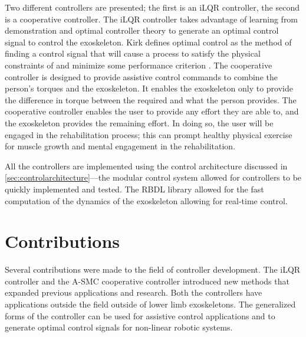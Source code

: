 Two different controllers are presented; the first is an iLQR controller, the second is a cooperative controller. The iLQR controller takes advantage of learning from demonstration and optimal controller theory to generate an optimal control signal to control the exoskeleton. Kirk defines optimal control as the method of finding a control signal that will cause a process to satisfy the physical constraints of and minimize some performance criterion \cite{kirk2004optimal}. The cooperative controller is designed to provide assistive control commands to combine the person's torques and the exoskeleton. It enables the exoskeleton only to provide the difference in torque between the required and what the person provides. The cooperative controller enables the user to provide any effort they are able to, and the exoskeleton provides the remaining effort. In doing so, the user will be engaged in the rehabilitation process; this can prompt healthy physical exercise for muscle growth and mental engagement in the rehabilitation.   

All the controllers are implemented using the control architecture discussed in \autoref{sec:controlarchitecture}—the modular control system allowed for controllers to be quickly implemented and tested. The RBDL library allowed for the fast computation of the dynamics of the exoskeleton allowing for real-time control. 








\section{Contributions}

Several contributions were made to the field of controller development. The iLQR controller and the A-SMC cooperative controller introduced new methods that expanded previous applications and research. Both the controllers have applications outside the field outside of lower limb exoskeletons. The generalized forms of the controller can be used for assistive control applications and to generate optimal control signals for non-linear robotic systems. 


